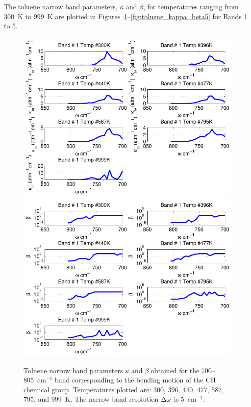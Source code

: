 The toluene narrow band parameters, $\bar{\kappa}$ and $\beta$, for temperatures ranging from 300~K to 999~K are plotted in Figures~\ref{fig:toluene_kappa_beta1}--\ref{fig:toluene_kappa_beta5} for Bands 1 to 5.

\newpage

\begin{figure}[p]
\begin{center}
\includegraphics[width=5.0in]{Figures/Toluene_Kappa_Band1_MALKMUS.pdf}
\includegraphics[width=5.0in]{Figures/Toluene_Beta_Band1_MALKMUS.pdf}
\end{center}
\caption{Toluene narrow band parameters $\bar{\kappa}$ and $\beta$ obtained for the 700--805~cm$^{-1}$ band corresponding to the bending motion of the $\rm CH$ chemical group. Temperatures plotted are: 300, 396, 440, 477, 587, 795, and 999~K. The narrow band resolution $\Delta \omega$ is 5~cm$^{-1}$.\label{fig:toluene_kappa_beta1}}
\end{figure}


